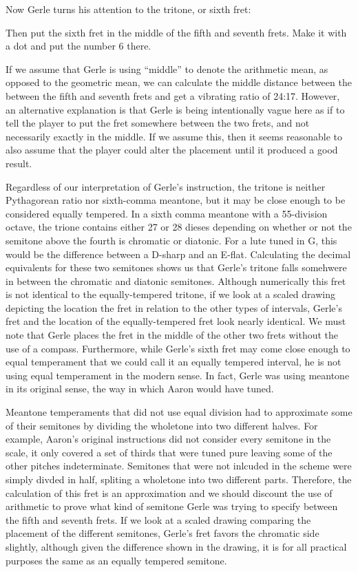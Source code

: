 Now Gerle turns his attention to the tritone, or sixth fret:
\begin{blocks}
Then put the sixth fret in the middle of the fifth and seventh frets.  Make it
with a dot and put the number 6 there.
\end{blocks}
If we assume that Gerle is using ``middle'' to denote the arithmetic mean, as opposed
to the geometric mean, we can calculate the middle distance between the between the
fifth and seventh frets and get a vibrating ratio of 24:17.  However, an alternative
explanation is that Gerle is being intentionally vague here as if to tell the player to
put the fret somewhere between the two frets, and not necessarily exactly in the
middle.  If we assume this, then it seems reasonable to also assume that the player
could alter the placement until it produced a good result.

Regardless of our interpretation of Gerle's instruction, the tritone is neither
Pythagorean ratio nor sixth-comma meantone, but it may be close enough to be considered
equally tempered. In a sixth comma meantone with a 55-division octave, the trione
contains either 27 or 28 dieses depending on whether or not the semitone above the
fourth is chromatic or diatonic.  For a lute tuned in G, this would be the difference
between a D-sharp and an E-flat. Calculating the decimal equivalents for these two
semitones shows us that Gerle's tritone falls somehwere in between the chromatic and
diatonic semitones.  Although numerically this fret is not identical to the
equally-tempered tritone, if we look at a scaled drawing depicting the location the
fret in relation to the other types of intervals, Gerle's fret and the location of the
equally-tempered fret look nearly identical. We must note that Gerle places the fret in
the middle of the other two frets without the use of a compass.  Furthermore, while
Gerle's sixth fret may come close enough to equal temperament that we could call it an
equally tempered interval, he is not using equal temperament in the modern sense.  In
fact, Gerle was using meantone in its original sense, the way in which Aaron would have
tuned.

Meantone temperaments that did not use equal division had to approximate some of their
semitones by dividing the wholetone into two different halves. For example, Aaron's
original instructions did not consider every semitone in the scale, it only covered a
set of thirds that were tuned pure leaving some of the other pitches indeterminate.
Semitones that were not inlcuded in the scheme were simply divded in half, spliting a
wholetone into two different parts. Therefore, the calculation of this fret is an
approximation and we should discount the use of arithmetic to prove what kind of
semitone Gerle was trying to specify between the fifth and seventh frets.  If we look
at a scaled drawing comparing the placement of the different semitones, Gerle's fret
favors the chromatic side slightly, although given the difference shown in the drawing,
it is for all practical purposes the same as an equally tempered semitone.


